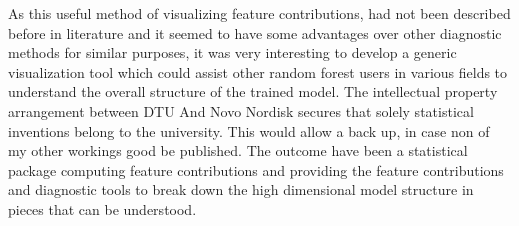 As this useful method of visualizing feature contributions, had not been described before in literature and it seemed to have some advantages over other diagnostic methods for similar purposes, it was very interesting to develop a generic visualization tool which could assist other random forest users in various fields to understand the overall structure of the trained model. The intellectual property arrangement between DTU And Novo Nordisk secures that solely statistical inventions belong to the university. This would allow a back up, in case non of my other workings good be published. The outcome have been a statistical package computing feature contributions and providing the feature contributions and diagnostic tools to break down the high dimensional model structure in pieces that can be understood.
